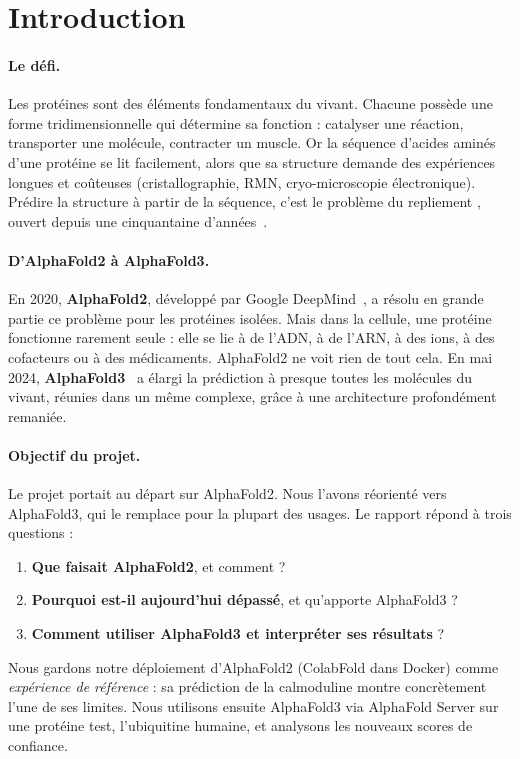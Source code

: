 \section{Introduction}

\paragraph{Le défi.} Les protéines sont des éléments fondamentaux du vivant. Chacune possède une forme tridimensionnelle qui détermine sa fonction : catalyser une réaction, transporter une molécule, contracter un muscle. Or la séquence d'acides aminés d'une protéine se lit facilement, alors que sa structure demande des expériences longues et coûteuses (cristallographie, RMN, cryo-microscopie électronique). Prédire la structure à partir de la séquence, c'est le \og problème du repliement \fg{}, ouvert depuis une cinquantaine d'années~\cite{ebi_course}.

\paragraph{D'AlphaFold2 à AlphaFold3.} En 2020, \textbf{AlphaFold2}, développé par Google DeepMind~\cite{jumper2021}, a résolu en grande partie ce problème pour les protéines isolées. Mais dans la cellule, une protéine fonctionne rarement seule : elle se lie à de l'ADN, à de l'ARN, à des ions, à des cofacteurs ou à des médicaments. AlphaFold2 ne voit rien de tout cela. En mai 2024, \textbf{AlphaFold3}~\cite{abramson2024} a élargi la prédiction à presque toutes les molécules du vivant, réunies dans un même complexe, grâce à une architecture profondément remaniée.

\paragraph{Objectif du projet.} Le projet portait au départ sur AlphaFold2. Nous l'avons réorienté vers AlphaFold3, qui le remplace pour la plupart des usages. Le rapport répond à trois questions :
\begin{enumerate}
  \item \textbf{Que faisait AlphaFold2}, et comment ?
  \item \textbf{Pourquoi est-il aujourd'hui dépassé}, et qu'apporte AlphaFold3 ?
  \item \textbf{Comment utiliser AlphaFold3 et interpréter ses résultats} ?
\end{enumerate}
Nous gardons notre déploiement d'AlphaFold2 (ColabFold dans Docker) comme \emph{expérience de référence} : sa prédiction de la calmoduline montre concrètement l'une de ses limites. Nous utilisons ensuite AlphaFold3 via AlphaFold Server sur une protéine test, l'ubiquitine humaine, et analysons les nouveaux scores de confiance.

